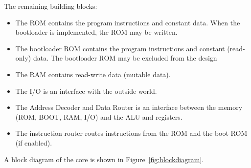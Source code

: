 \documentclass[12pt]{article}
\begin{document}
The remaining building blocks:
\begin{itemize}
\item The ROM contains the program instructions and constant data. When the bootloader is implemented, the ROM may be written.
\item The bootloader ROM contains the program instructions and constant (read-only) data. The bootloader ROM may be excluded from the design
\item The RAM contains read-write data (mutable data).
\item The I/O is an interface with the outside world.
\item The Address Decoder and Data Router is an interface between the memory (ROM, BOOT, RAM, I/O) and the ALU and registers.
\item The instruction router routes instructions from the ROM and the boot ROM (if enabled).
\end{itemize}

A block diagram of the core is shown in Figure~\ref{fig:blockdiagram}.
\end{document}
